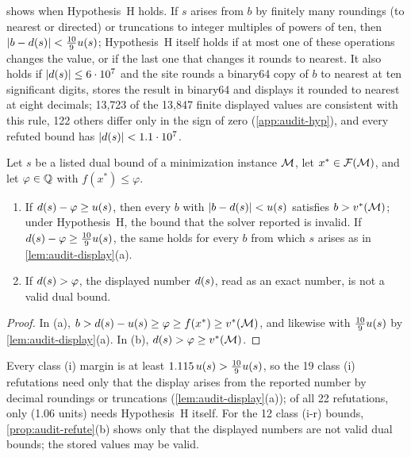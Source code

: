  shows when Hypothesis~H holds.
If $s$ arises from $b$ by finitely many roundings (to nearest or directed) or truncations to integer multiples of powers of ten, then $|b-d(s)|<\tfrac{10}{9}u(s)$; Hypothesis~H itself holds if at most one of these operations changes the value, or if the last one that changes it rounds to nearest.
It also holds if $|d(s)|\le6\cdot10^{7}$ and the site rounds a binary64 copy of $b$ to nearest at ten significant digits, stores the result in binary64 and displays it rounded to nearest at eight decimals; 13,723 of the 13,847 finite displayed values are consistent with this rule, 122 others differ only in the sign of zero (\cref{app:audit-hyp}), and every refuted bound has $|d(s)|<1.1\cdot10^{7}$.

\begin{proposition}[refutation]\label{prop:audit-refute}
Let $s$ be a listed dual bound of a minimization instance $\mathcal{M}$, let $x^\ast\in\mathcal{F}(\mathcal{M})$, and let $\varphi\in\mathbb{Q}$ with $f(x^\ast)\le\varphi$.
\begin{enumerate}\setlength{\itemsep}{0pt}\setlength{\parsep}{0pt}
\item[(a)] If $d(s)-\varphi\ge u(s)$, then every $b$ with $|b-d(s)|<u(s)$ satisfies $b>v^{*}(\mathcal{M})$; under Hypothesis~H, the bound that the solver reported is invalid.
If $d(s)-\varphi\ge\tfrac{10}{9}u(s)$, the same holds for every $b$ from which $s$ arises as in \cref{lem:audit-display}(a).
\item[(b)] If $d(s)>\varphi$, the displayed number $d(s)$, read as an exact number, is not a valid dual bound.
\end{enumerate}
\end{proposition}

\begin{proof}
In (a), $b>d(s)-u(s)\ge\varphi\ge f(x^\ast)\ge v^{*}(\mathcal{M})$, and likewise with $\tfrac{10}{9}u(s)$ by \cref{lem:audit-display}(a). In (b), $d(s)>\varphi\ge v^{*}(\mathcal{M})$.
\end{proof}

Every class (i) margin is at least $1.115\,u(s)>\tfrac{10}{9}u(s)$, so the 19 class (i) refutations need only that the display arises from the reported number by decimal roundings or truncations (\cref{lem:audit-display}(a)); of all 22 refutations, only  (1.06 units) needs Hypothesis~H itself.
For the 12 class (i-r) bounds, \cref{prop:audit-refute}(b) shows only that the displayed numbers are not valid dual bounds; the stored values may be valid.

